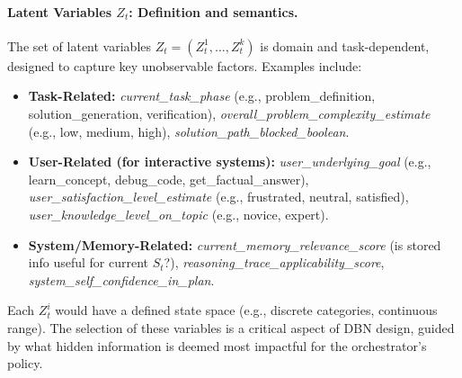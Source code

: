 \documentclass[11pt]{article}
\begin{document}
\paragraph{Latent Variables $Z_t$: Definition and semantics.}
The set of latent variables $Z_t = (Z_t^1, \dots, Z_t^k)$ is domain and task-dependent, designed to capture key unobservable factors. Examples include:
\begin{itemize}
    \item \textbf{Task-Related:} \emph{current_task_phase} (e.g., problem\_definition, solution\_generation, verification), \emph{overall_problem_complexity_estimate} (e.g., low, medium, high), \emph{solution_path_blocked_boolean}.
    \item \textbf{User-Related (for interactive systems):} \emph{user_underlying_goal} (e.g., learn\_concept, debug\_code, get\_factual\_answer), \emph{user_satisfaction_level_estimate} (e.g., frustrated, neutral, satisfied), \emph{user_knowledge_level_on_topic} (e.g., novice, expert).
    \item \textbf{System/Memory-Related:} \emph{current_memory_relevance_score} (is stored info useful for current $S_t$?), \emph{reasoning_trace_applicability_score}, \emph{system_self_confidence_in_plan}.
\end{itemize}
Each $Z_t^i$ would have a defined state space (e.g., discrete categories, continuous range). The selection of these variables is a critical aspect of DBN design, guided by what hidden information is deemed most impactful for the orchestrator's policy.
\end{document}
